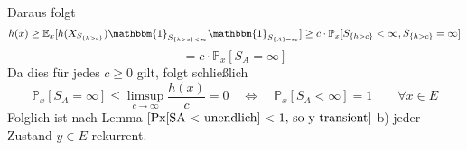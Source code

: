 \begin{itemize}
\begin{equation*}
\end{equation*}
Daraus folgt
\begin{equation*}
h(x) \geq \mathbb{E}_{x}[h(X_{S_{{\lbrace h > c \rbrace}}}) \mathbbm{1}_{S_{{\lbrace h > c \rbrace} < \infty}}\mathbbm{1}_{S_{{\lbrace A \rbrace} = \infty}}] \geq c \cdot \mathbb{P}_{x}[S_{{\lbrace h > c \rbrace}} < \infty, S_{{\lbrace h > c \rbrace}} = \infty]
\end{equation*}
\begin{equation*}
= c \cdot \mathbb{P}_{x}[S_{A} = \infty]
\end{equation*}
Da dies für jedes $c \geq 0$ gilt, folgt schließlich
\begin{equation*}
\mathbb{P}_{x}[S_{A} = \infty] \leq \limsup_{c \to \infty} \dfrac{h(x)}{c} = 0 \quad \Leftrightarrow \quad \mathbb{P}_{x}[S_{A} < \infty] = 1 \qquad \forall x \in E
\end{equation*}
Folglich ist nach Lemma $\ref{Px[SA < unendlich] < 1, so y transient}$ b) jeder Zustand $y \in E$ rekurrent.
\end{itemize}\mbox{}
